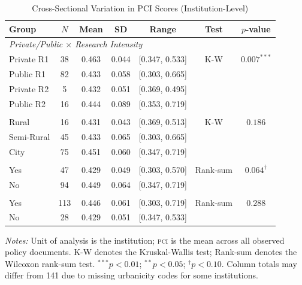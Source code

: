 \documentclass[12pt]{article}
\newcommand{\PCI}{\textsc{pci}}
\begin{document}
\begin{table}[H]
\centering
\caption{Cross-Sectional Variation in PCI Scores (Institution-Level)}
\label{tab:crosssec}
\begin{threeparttable}
\small
\begin{tabular}{lcccccc}
\toprule
\textbf{Group} & \textbf{$N$} & \textbf{Mean} & \textbf{SD}
  & \textbf{Range} & \textbf{Test} & \textbf{$p$-value} \\
\midrule
\multicolumn{7}{l}{\textit{Private/Public $\times$ Research Intensity}} \\
\quad Private R1 & 38 & 0.463 & 0.044 & [0.347, 0.533] & K-W & $0.007^{***}$ \\
\quad Public R1  & 82 & 0.433 & 0.058 & [0.303, 0.665] & & \\
\quad Private R2 &  5 & 0.432 & 0.051 & [0.369, 0.495] & & \\
\quad Public R2  & 16 & 0.444 & 0.089 & [0.353, 0.719] & & \\
\addlinespace
\multicolumn{7}{l}{\textit{Urbanicity}} \\
\quad Rural        & 16 & 0.431 & 0.043 & [0.369, 0.513] & K-W & $0.186$ \\
\quad Semi-Rural   & 45 & 0.433 & 0.065 & [0.303, 0.665] & & \\
\quad City         & 75 & 0.451 & 0.060 & [0.347, 0.719] & & \\
\addlinespace
\multicolumn{7}{l}{\textit{Land-Grant Institution}} \\
\quad Yes &  47 & 0.429 & 0.049 & [0.303, 0.570] & Rank-sum & $0.064^{\dagger}$ \\
\quad No  &  94 & 0.449 & 0.064 & [0.347, 0.719] & & \\
\addlinespace
\multicolumn{7}{l}{\textit{Medical School}} \\
\quad Yes & 113 & 0.446 & 0.061 & [0.303, 0.719] & Rank-sum & $0.288$ \\
\quad No  &  28 & 0.429 & 0.051 & [0.347, 0.533] & & \\
\bottomrule
\end{tabular}
\begin{tablenotes}
\small
\item \textit{Notes:} Unit of analysis is the institution; \PCI{} is the mean
  across all observed policy documents.  K-W denotes the Kruskal-Wallis test;
  Rank-sum denotes the Wilcoxon rank-sum test.
  $^{***}p < 0.01$; $^{**}p < 0.05$; $^{\dagger}p < 0.10$.
  Column totals may differ from 141 due to missing urbanicity codes for some institutions.
\end{tablenotes}
\end{threeparttable}
\end{table}
\end{document}
